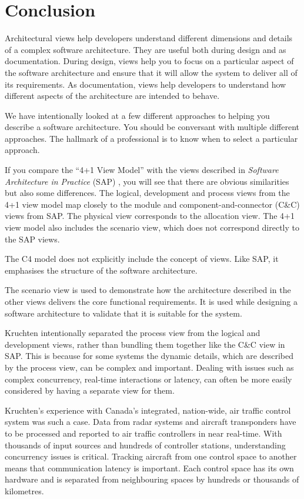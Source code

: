 \section{Conclusion}
Architectural views help developers understand different dimensions and details of a complex software architecture.
They are useful both during design and as documentation.
During design, views help you to focus on a particular aspect of the software architecture and ensure that it will allow the system to deliver all of its requirements.
As documentation, views help developers to understand how different aspects of the architecture are intended to behave.

We have intentionally looked at a few different approaches to helping you describe a software architecture.
You should be conversant with multiple different approaches.
The hallmark of a professional is to know when to select a particular approach.

If you compare the ``4+1 View Model'' \cite{4+1-model} with the views described in \textit{Software Architecture in Practice} (SAP) \cite{bass2021software},
you will see that there are obvious similarities but also some differences.
The logical, development and process views from the 4+1 view model map closely to the module and component-and-connector (C\&C) views from SAP.
The physical view corresponds to the allocation view.
The 4+1 view model also includes the scenario view, which does not correspond directly to the SAP views.

The C4 model does not explicitly include the concept of views.
Like SAP, it emphasises the structure of the software architecture.

The scenario view is used to demonstrate how the architecture described in the other views delivers the core functional requirements.
It is used while designing a software architecture to validate that it is suitable for the system.

Kruchten intentionally separated the process view from the logical and development views,
rather than bundling them together like the C\&C view in SAP.
This is because for some systems the dynamic details, which are described by the process view, can be complex and important.
Dealing with issues such as complex concurrency, real-time interactions or latency, can often be more easily considered by having a separate view for them.

Kruchten's experience with Canada's integrated, nation-wide, air traffic control system was such a case.
Data from radar systems and aircraft transponders have to be processed and reported to air traffic controllers in near real-time.
With thousands of input sources and hundreds of controller stations, understanding concurrency issues is critical.
Tracking aircraft from one control space to another means that communication latency is important.
Each control space has its own hardware and is separated from neighbouring spaces by hundreds or thousands of kilometres.

